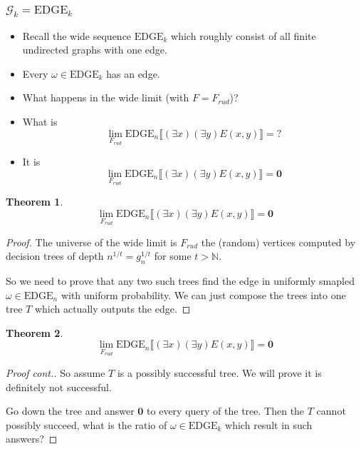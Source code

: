 \documentclass{beamer}
\newcommand{\N}{\mathbb{N}}
\newcommand{\bbl}{\llbracket}
\newcommand{\bbr}{\rrbracket}
\newcommand{\G}{\mathcal{G}}
\newcommand{\0}{\textbf{0}}
\newcommand{\1}{\textbf{1}}
\newcommand{\EDGE}{\text{EDGE}}
\newtheorem{thrm}{Theorem}
\begin{document}
\begin{frame}
\frametitle{$\G_k=\EDGE_k$}

\begin{itemize}[<+->]
\item Recall the wide sequence $\EDGE_k$ which roughly consist of all finite undirected graphs with one edge.
\item Every $\omega\in\EDGE_k$ has an edge.
\item What happens in the wide limit (with $F=F_{rud}$)?
\item What is
\[\lim_{F_{rud}}\EDGE_n\bbl(\exists x)(\exists y)E(x,y)\bbr=?\]
\pause
\item It is
\[\lim_{F_{rud}}\EDGE_n\bbl(\exists x)(\exists y)E(x,y)\bbr=\0\]
\end{itemize}


\end{frame}

\begin{frame}
\begin{thrm}
\[\lim_{F_{rud}}\EDGE_n\bbl(\exists x)(\exists y)E(x,y)\bbr=\0\]
\end{thrm}
\begin{proof}\renewcommand{\qedsymbol}{}
The universe of the wide limit is $F_{rud}$ the (random) vertices computed by decision trees of depth $n^{1/t}=g_n^{1/t}$ for some $t>\N$.

So we need to prove that any two such trees find the edge in uniformly smapled $\omega\in\EDGE_n$ with uniform probability. We can just compose the trees into one tree $T$ which actually outputs the edge.
\end{proof}
\end{frame}

\begin{frame}
\begin{thrm}
\[\lim_{F_{rud}}\EDGE_n\bbl(\exists x)(\exists y)E(x,y)\bbr=\0\]
\end{thrm}
\begin{proof}[Proof cont.]\renewcommand{\qedsymbol}{}
So assume $T$ is a possibly successful tree. We will prove it is definitely not successful.

Go down the tree and answer $\textbf{0}$ to every query of the tree. Then the $T$ cannot possibly succeed, what is the ratio of $\omega\in\EDGE_k$ which result in such answers? 

\end{proof}
\end{frame}
\end{document}

